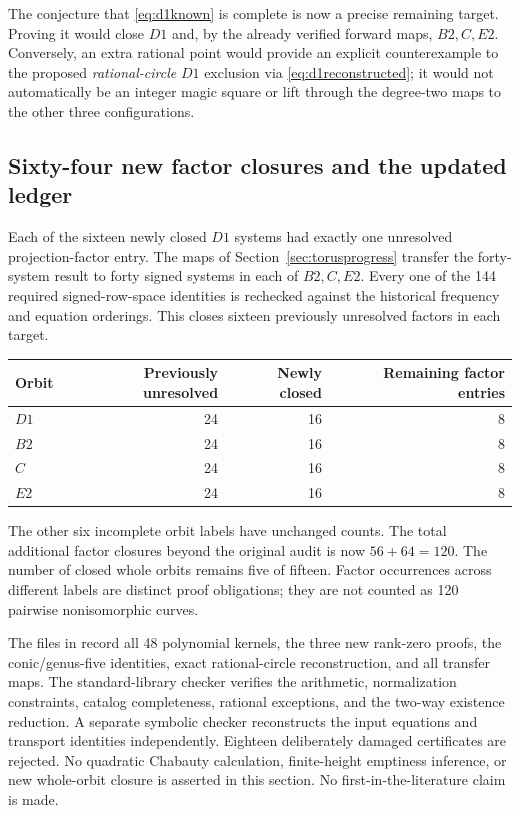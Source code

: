 The conjecture that \eqref{eq:d1known} is complete is now a precise remaining target. Proving it would close $D1$ and, by the already verified forward maps, $B2,C,E2$. Conversely, an extra rational point would provide an explicit counterexample to the proposed \emph{rational-circle} $D1$ exclusion via \eqref{eq:d1reconstructed}; it would not automatically be an integer magic square or lift through the degree-two maps to the other three configurations.

\subsection{Sixty-four new factor closures and the updated ledger}
Each of the sixteen newly closed $D1$ systems had exactly one unresolved projection-factor entry. The maps of Section~\ref{sec:torusprogress} transfer the forty-system result to forty signed systems in each of $B2,C,E2$. Every one of the 144 required signed-row-space identities is rechecked against the historical frequency and equation orderings. This closes sixteen previously unresolved factors in each target.
\begin{center}
\begin{tabular}{lrrr}
\toprule
Orbit & Previously unresolved & Newly closed & Remaining factor entries\\
\midrule
$D1$ &24&16&8\\
$B2$ &24&16&8\\
$C$  &24&16&8\\
$E2$ &24&16&8\\
\bottomrule
\end{tabular}
\end{center}
The other six incomplete orbit labels have unchanged counts. The total additional factor closures beyond the original audit is now $56+64=120$. The number of closed whole orbits remains five of fifteen. Factor occurrences across different labels are distinct proof obligations; they are not counted as 120 pairwise nonisomorphic curves.

The files in  record all 48 polynomial kernels, the three new rank-zero proofs, the conic/genus-five identities, exact rational-circle reconstruction, and all transfer maps. The standard-library checker verifies the arithmetic, normalization constraints, catalog completeness, rational exceptions, and the two-way existence reduction. A separate symbolic checker reconstructs the input equations and transport identities independently. Eighteen deliberately damaged certificates are rejected. No quadratic Chabauty calculation, finite-height emptiness inference, or new whole-orbit closure is asserted in this section. No first-in-the-literature claim is made.
